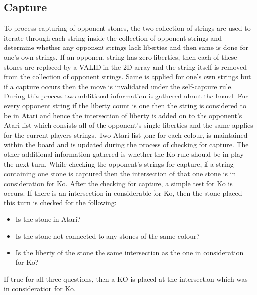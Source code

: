 \documentclass{l4proj}
\begin{document}
\subsection{Capture}
To process capturing of opponent stones, the two collection of strings are used to iterate through each string inside the collection of opponent strings and determine whether any opponent strings lack liberties and then same is done for one’s own strings. If an opponent string has zero liberties, then each of these stones are replaced by a VALID in the 2D array and the string itself is removed from the collection of opponent strings. Same is applied for one’s own strings but if a capture occurs then the move is invalidated under the self-capture rule.
During this process two additional information is gathered about the board. For every opponent string if the liberty count is one then the string is considered to be in Atari and hence the intersection of liberty is added on to the opponent’s Atari list which consists all of the opponent’s single liberties and the same applies for the current players strings. Two Atari list ,one for each colour, is maintained within the board and is updated during the process of checking for capture.
The other additional information gathered is whether the Ko rule should be in play the next turn. While checking the opponent’s strings for capture, if a string containing one stone is captured then the intersection of that one stone is in consideration for Ko. After the checking for capture, a simple test for Ko is occurs. If there is an intersection in considerable for Ko, then the stone placed this turn is checked for the following:


\begin{itemize}
    \item Is the stone in Atari?
    \item Is the stone not connected to any stones of the same colour?
    \item Is the liberty of the stone the same intersection as the one in consideration for Ko?
\end{itemize}

If true for all three questions, then a KO is placed at the intersection which was in consideration for Ko.
\end{document}

